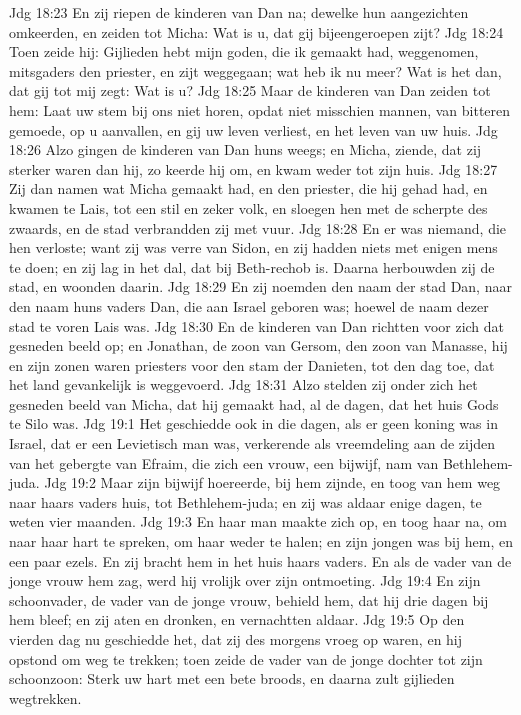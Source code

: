 Jdg 18:23  En zij riepen de kinderen van Dan na; dewelke hun aangezichten omkeerden, en zeiden tot Micha: Wat is u, dat gij bijeengeroepen zijt?
Jdg 18:24  Toen zeide hij: Gijlieden hebt mijn goden, die ik gemaakt had, weggenomen, mitsgaders den priester, en zijt weggegaan; wat heb ik nu meer? Wat is het dan, dat gij tot mij zegt: Wat is u?
Jdg 18:25  Maar de kinderen van Dan zeiden tot hem: Laat uw stem bij ons niet horen, opdat niet misschien mannen, van bitteren gemoede, op u aanvallen, en gij uw leven verliest, en het leven van uw huis.
Jdg 18:26  Alzo gingen de kinderen van Dan huns weegs; en Micha, ziende, dat zij sterker waren dan hij, zo keerde hij om, en kwam weder tot zijn huis.
Jdg 18:27  Zij dan namen wat Micha gemaakt had, en den priester, die hij gehad had, en kwamen te Lais, tot een stil en zeker volk, en sloegen hen met de scherpte des zwaards, en de stad verbrandden zij met vuur.
Jdg 18:28  En er was niemand, die hen verloste; want zij was verre van Sidon, en zij hadden niets met enigen mens te doen; en zij lag in het dal, dat bij Beth-rechob is. Daarna herbouwden zij de stad, en woonden daarin.
Jdg 18:29  En zij noemden den naam der stad Dan, naar den naam huns vaders Dan, die aan Israel geboren was; hoewel de naam dezer stad te voren Lais was.
Jdg 18:30  En de kinderen van Dan richtten voor zich dat gesneden beeld op; en Jonathan, de zoon van Gersom, den zoon van Manasse, hij en zijn zonen waren priesters voor den stam der Danieten, tot den dag toe, dat het land gevankelijk is weggevoerd.
Jdg 18:31  Alzo stelden zij onder zich het gesneden beeld van Micha, dat hij gemaakt had, al de dagen, dat het huis Gods te Silo was.
Jdg 19:1  Het geschiedde ook in die dagen, als er geen koning was in Israel, dat er een Levietisch man was, verkerende als vreemdeling aan de zijden van het gebergte van Efraim, die zich een vrouw, een bijwijf, nam van Bethlehem-juda.
Jdg 19:2  Maar zijn bijwijf hoereerde, bij hem zijnde, en toog van hem weg naar haars vaders huis, tot Bethlehem-juda; en zij was aldaar enige dagen, te weten vier maanden.
Jdg 19:3  En haar man maakte zich op, en toog haar na, om naar haar hart te spreken, om haar weder te halen; en zijn jongen was bij hem, en een paar ezels. En zij bracht hem in het huis haars vaders. En als de vader van de jonge vrouw hem zag, werd hij vrolijk over zijn ontmoeting.
Jdg 19:4  En zijn schoonvader, de vader van de jonge vrouw, behield hem, dat hij drie dagen bij hem bleef; en zij aten en dronken, en vernachtten aldaar.
Jdg 19:5  Op den vierden dag nu geschiedde het, dat zij des morgens vroeg op waren, en hij opstond om weg te trekken; toen zeide de vader van de jonge dochter tot zijn schoonzoon: Sterk uw hart met een bete broods, en daarna zult gijlieden wegtrekken.
